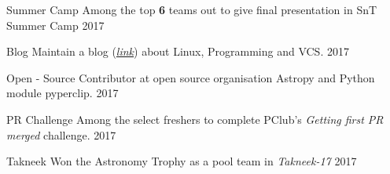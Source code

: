\begin{cvhonors}
  \cvhonor
    {Summer Camp}
    {Among the top \textbf{6} teams out to give final presentation in SnT Summer Camp}
    {}
    {2017}

  \cvhonor
    {Blog}
    {Maintain a blog (\textit{\href{http://aniketpandey.com/homepage}{link}}) about Linux, Programming and VCS.}
    {}
    {2017}

  \cvhonor
    {Open - Source}
    {Contributor at open source organisation Astropy and Python module pyperclip.}
    {}
    {2017}

  \cvhonor
    {PR Challenge}
    {Among the select freshers to complete PClub's \textit{Getting first PR merged} challenge.}
    {}
    {2017}

  \cvhonor
    {Takneek}
    {Won the Astronomy Trophy as a pool team in \textit{Takneek-17}}
    {}
    {2017}

  
\end{cvhonors}
